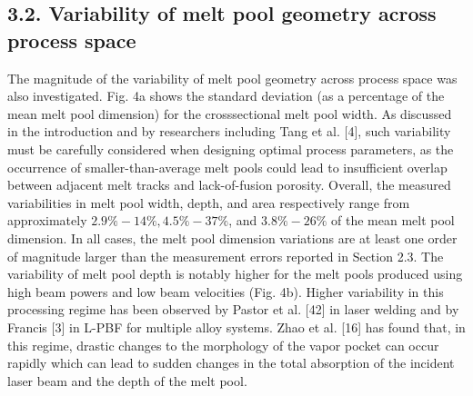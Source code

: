 \documentclass[10pt]{article}
\begin{document}
\subsection*{3.2. Variability of melt pool geometry across process space}
The magnitude of the variability of melt pool geometry across process space was also investigated. Fig. 4a shows the standard deviation (as a percentage of the mean melt pool dimension) for the crosssectional melt pool width. As discussed in the introduction and by researchers including Tang et al. [4], such variability must be carefully considered when designing optimal process parameters, as the occurrence of smaller-than-average melt pools could lead to insufficient overlap between adjacent melt tracks and lack-of-fusion porosity. Overall, the measured variabilities in melt pool width, depth, and area respectively range from approximately $2.9 \%-14 \%, 4.5 \%-37 \%$, and $3.8 \%-26 \%$ of the mean melt pool dimension. In all cases, the melt pool dimension variations are at least one order of magnitude larger than the measurement errors reported in Section 2.3. The variability of melt pool depth is notably higher for the melt pools produced using high beam powers and low beam velocities (Fig. 4b). Higher variability in this processing regime has been observed by Pastor et al. [42] in laser welding and by Francis [3] in L-PBF for multiple alloy systems. Zhao et al. [16] has found that, in this regime, drastic changes to the morphology of the vapor pocket can occur rapidly which can lead to sudden changes in the total absorption of the incident laser beam and the depth of the melt pool.
\end{document}
